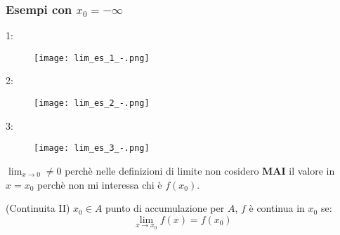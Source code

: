 \documentclass[../main.tex, class=article, 12pt]{subfiles}
\begin{document}
\subsubsection{Esempi con $ x_0 = -\infty $}
\begin{exmp}
       1:
       \begin{figure}[H]
         	\texttt{[image: lim\_es\_1\_-.png]}
         	\caption{}
       \end{figure}
       
\end{exmp}
\begin{exmp}
       2:
       \begin{figure}[H]
         	\texttt{[image: lim\_es\_2\_-.png]}
         	\caption{}
       \end{figure}
       
\end{exmp}
\begin{exmp}
       3:
       \begin{figure}[H]
         	\texttt{[image: lim\_es\_3\_-.png]}
         	\caption{}
       \end{figure}
\end{exmp}





$ \lim_{x \to 0} \not = 0 $ perchè nelle definizioni di limite non cosidero \textbf{MAI} il valore in $x = x_0$ perchè non mi interessa chi è $ f(x_0) $.

\begin{definition}
        (Continuita II) \newline
        $ x_0 \in A $ punto di accumulazione per $ A $, $ f $ è continua in $x_0$ se:
        \begin{equation*}
                \lim_{x \to x_0} f(x) = f(x_0)
        \end{equation*}
\end{definition}
\end{document}
